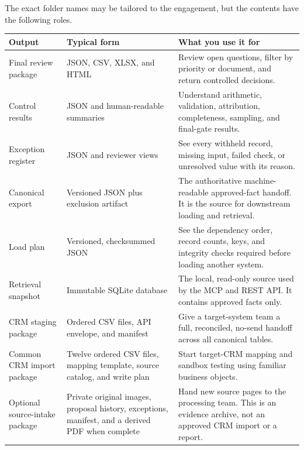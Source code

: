 \documentclass[
]{article}
\newcounter{none} %
\begin{document}
The exact folder names may be tailored to the engagement, but the
contents have the following roles.

{\def\LTcaptype{none} %
\begin{longtable}[]{@{}
  >{\raggedright\arraybackslash}p{}
  >{\raggedright\arraybackslash}p{}
  >{\raggedright\arraybackslash}p{}@{}}
\toprule\noalign{}
\begin{minipage}[b]{\linewidth}\raggedright
Output
\end{minipage} & \begin{minipage}[b]{\linewidth}\raggedright
Typical form
\end{minipage} & \begin{minipage}[b]{\linewidth}\raggedright
What you use it for
\end{minipage} \\
\midrule\noalign{}
\endhead
\bottomrule\noalign{}
\endlastfoot
Final review package & JSON, CSV, XLSX, and HTML & Review open
questions, filter by priority or document, and return controlled
decisions. \\
Control results & JSON and human-readable summaries & Understand
arithmetic, validation, attribution, completeness, sampling, and
final-gate results. \\
Exception register & JSON and reviewer views & See every withheld
record, missing input, failed check, or unresolved value with its
reason. \\
Canonical export & Versioned JSON plus exclusion artifact & The
authoritative machine-readable approved-fact handoff. It is the source
for downstream loading and retrieval. \\
Load plan & Versioned, checksummed JSON & See the dependency order,
record counts, keys, and integrity checks required before loading
another system. \\
Retrieval snapshot & Immutable SQLite database & The local, read-only
source used by the MCP and REST API. It contains approved facts only. \\
CRM staging package & Ordered CSV files, API envelope, and manifest &
Give a target-system team a full, reconciled, no-send handoff across all
canonical tables. \\
Common CRM import package & Twelve ordered CSV files, mapping template,
source catalog, and write plan & Start target-CRM mapping and sandbox
testing using familiar business objects. \\
Optional source-intake package & Private original images, proposal
history, exceptions, manifest, and a derived PDF when complete & Hand
new source pages to the processing team. This is an evidence archive,
not an approved CRM import or a report. \\
\end{longtable}
}
\end{document}
